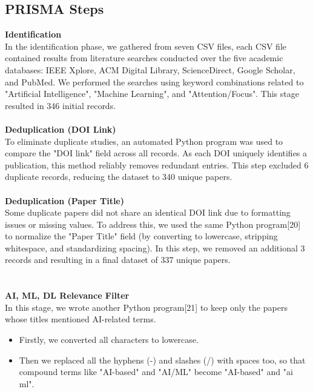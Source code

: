 \documentclass[12pt]{article}
\begin{document}
\subsection{PRISMA Steps}
\textbf{Identification} \\ 
In the identification phase, we gathered from seven CSV files, each CSV file contained results from literature searches conducted over the five academic databases: IEEE Xplore, ACM Digital Library, ScienceDirect, Google Scholar, and PubMed. We performed the searches using keyword combinations related to "Artificial Intelligence", "Machine Learning", and "Attention/Focus". This stage resulted in 346 initial records. \\ \\
\textbf{Deduplication (DOI Link)} \\ 
To eliminate duplicate studies, an automated Python program was used to compare the "DOI link" field across all records. As each DOI uniquely identifies a publication, this method reliably removes redundant entries. This step excluded 6 duplicate records, reducing the dataset to 340 unique papers. \\ \\
\textbf{Deduplication (Paper Title)} \\ 
Some duplicate papers did not share an identical DOI link due to formatting issues or missing values. To address this, we used the same Python program[20] to normalize the "Paper Title" field (by converting to lowercase, stripping whitespace, and standardizing spacing). In this step, we removed an additional 3 records and resulting in a final dataset of 337 unique papers. \\ \\ \\
\textbf{AI, ML, DL Relevance Filter} \\ 
In this stage, we wrote another Python program[21] to keep only the papers whose titles mentioned AI-related terms. 
\begin{itemize}
    \item Firstly, we converted all characters to lowercase.
    \item Then we replaced all the hyphens (-) and slashes (/) with spaces too, so that compound terms like "AI-based" and "AI/ML" become "AI-based" and "ai ml".
\end{itemize}
\end{document}
